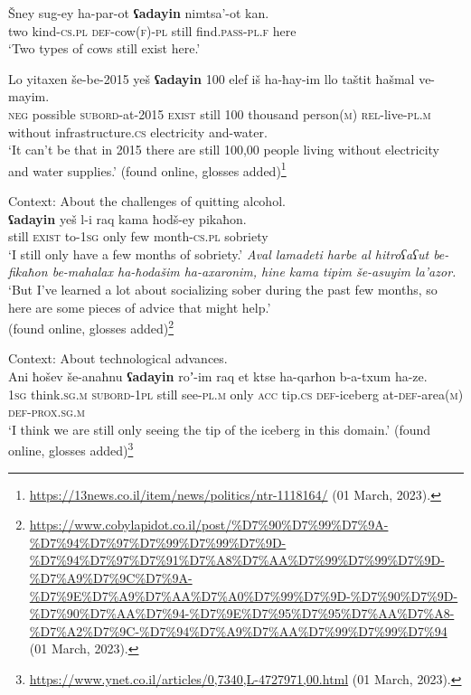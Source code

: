 \begin{exe}
	\ex\label{appendixHebrewAdayinScalar1}
	\gll Šney	sug-ey	ha-par-ot	\textbf{ʕadayin}	nimtsa\rq{}-ot	kan.\\
	two	kind-\textsc{cs}.\textsc{pl} \textsc{def}-cow(\textsc{f})-\textsc{pl} still  find.\textsc{pass}-\textsc{pl}.\textsc{f} here\\
	\glt \lq Two types of cows still exist here.\rq{ }\parencite[95]{Glinert1989}

	\ex\label{appendixHebrewAdayinScalar2}
	\gll Lo yitaxen še-be-2015 yeš \textbf{ʕadayin} 100 elef iš ha-ħay-im llo taštit ħašmal ve-mayim.\\
	\textsc{neg} possible \textsc{subord}-at-2015 \textsc{exist} still 100 thousand person(\textsc{m}) \textsc{rel}-live-\textsc{pl}.\textsc{m} without infrastructure.\textsc{cs} electricity and-water.\\
	\glt \lq It can't be that in 2015 there are still 100,00 people living without electricity and water supplies.\rq{ }(found online, glosses added)\footnote{\url{https://13news.co.il/item/news/politics/ntr-1118164/} (01 March, 2023).}


	\ex Context: About the challenges of quitting alcohol.\label{appendixHebrewAdayinScalar3}\\
	\gll \textbf{ʕadayin} yeš l-i raq kama ħodš-ey pikaħon.\\
	still \textsc{exist} to-1\textsc{sg} only few month-\textsc{cs}.\textsc{pl} sobriety\\
	\glt \lq I still only have a few months of sobriety.\rq
	\exi{}\textit{Aval lamadeti harbe al hitroʕaʕut be-fikaħon be-mahalax ha-ħodašim ha-axaronim, hine kama tipim še-asuyim la\rq{}azor.}\\
		\lq But I've learned a lot about socializing sober during the past few months, so here are some pieces of advice that might help.\rq{ }
		\\(found online, glosses added)\footnote{\url{https://www.cobylapidot.co.il/post/\%D7\%90\%D7\%99\%D7\%9A-\%D7\%94\%D7\%97\%D7\%99\%D7\%99\%D7\%9D-\%D7\%94\%D7\%97\%D7\%91\%D7\%A8\%D7\%AA\%D7\%99\%D7\%99\%D7\%9D-\%D7\%A9\%D7\%9C\%D7\%9A-\%D7\%9E\%D7\%A9\%D7\%AA\%D7\%A0\%D7\%99\%D7\%9D-\%D7\%90\%D7\%9D-\%D7\%90\%D7\%AA\%D7\%94-\%D7\%9E\%D7\%95\%D7\%95\%D7\%AA\%D7\%A8-\%D7\%A2\%D7\%9C-\%D7\%94\%D7\%A9\%D7\%AA\%D7\%99\%D7\%99\%D7\%94} (01 March, 2023).}

	\ex Context: About technological advances.	\label{appendixHebrewAdayinScalar4}\\
	\gll Ani ħošev še-anaħnu \textbf{ʕadayin} roʼ-im raq et ktse ha-qarħon b-a-txum ha-ze.\\
	1\textsc{sg} think.\textsc{sg}.\textsc{m} \textsc{subord}-1\textsc{pl} still see-\textsc{pl}.\textsc{m} only \textsc{acc} tip.\textsc{cs} \textsc{def}-iceberg at-\textsc{def}-area(\textsc{m}) \textsc{def}-\textsc{prox}.\textsc{sg}.\textsc{m}\\
	\glt \lq I think we are still only seeing the tip of the iceberg in this domain.\rq{ }(found online, glosses added)\footnote{\url{https://www.ynet.co.il/articles/0,7340,L-4727971,00.html} (01 March, 2023).}


\end{exe}
